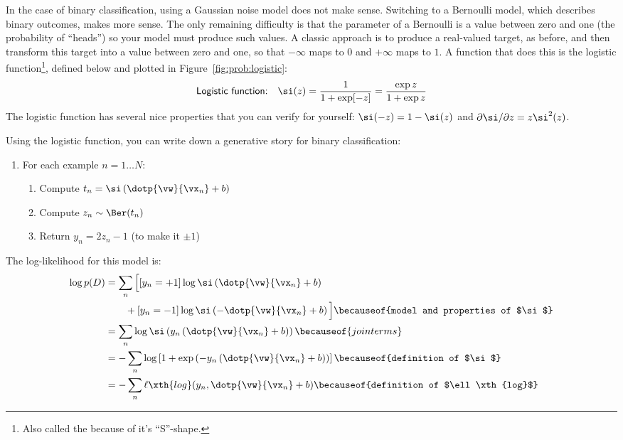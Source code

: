 In the case of binary classification, using a Gaussian noise model
does not make sense.  Switching to a Bernoulli model, which describes
binary outcomes, makes more sense.  The only remaining difficulty is
that the parameter of a Bernoulli is a value between zero and one (the
probability of ``heads'') so your model must produce such values.  A
classic approach is to produce a real-valued target, as before, and
then transform this target into a value between zero and one, so that
$-\infty$ maps to $0$ and $+\infty$ maps to $1$.  A function that does
this is the logistic function\footnote{Also called the
   because of it's ``S''-shape.}, defined
below and plotted in Figure~\ref{fig:prob:logistic}:
%
%
\begin{equation}
\textsf{Logistic function:} \quad
\si(z) = \frac 1 {1 + \exp[-z]} = \frac {\exp z}{1 + \exp z}
\end{equation}
%
The logistic function has several nice properties that you can verify
for yourself: $\si(-z) = 1 - \si(z)$ and $\partial \si/\partial z = z
\si^2(z)$.

Using the logistic function, you can write down a generative story for
binary classification:

\begin{enumerate}
  \item For each example $n=1 \dots N$:
    \begin{enumerate}
      \item Compute $t_n = \si\left(\dotp{\vw}{\vx_n} + b\right)$
      \item Compute $z_n \sim \Ber(t_n)$
      \item Return $y_n = 2 z_n - 1$ (to make it $\pm 1$)
    \end{enumerate}
\end{enumerate}

The log-likelihood for this model is:
%
\begin{align}
   \log p(D)
&= \sum_n \Big[ [y_n=+1] \log \si\left(\dotp{\vw}{\vx_n} + b\right)\nonumber\\
&\qquad
               + [y_n=-1] \log \si\left(-\dotp{\vw}{\vx_n} + b\right)
            \Big]
   \becauseof{model and properties of $\si$}\\
&= \sum_n \log \si\left( y_n \left(\dotp{\vw}{\vx_n} + b\right)\right)
   \becauseof{join terms} \\
&= - \sum_n \log \left[ 1 + \exp\left( - y_n \left(\dotp{\vw}{\vx_n} +
      b\right)\right) \right]
    \becauseof{definition of $\si$}\\
&= - \sum_n \ell\xth{log}(y_n, \dotp{\vw}{\vx_n} + b)
    \becauseof{definition of $\ell\xth{log}$}
\end{align}

